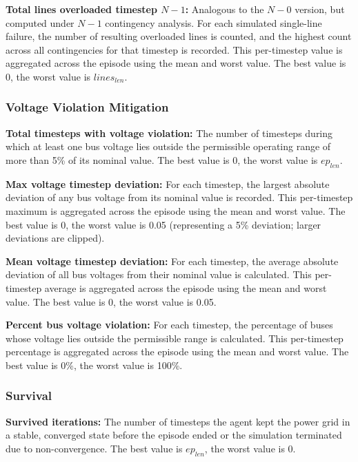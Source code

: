 \textbf{Total lines overloaded timestep $N-1$:} Analogous to the $N-0$ version, but computed under $N-1$ contingency analysis. For each simulated single-line failure, the number of resulting overloaded lines is counted, and the highest count across all contingencies for that timestep is recorded. This per-timestep value is aggregated across the episode using the mean and worst value. The best value is 0, the worst value is $lines_{len}$.


\subsubsection{Voltage Violation Mitigation}
\label{app:metrics_voltage_violation_mitigation}

\textbf{Total timesteps with voltage violation:} The number of timesteps during which at least one bus voltage lies outside the permissible operating range of more than 5\% of its nominal value. The best value is 0, the worst value is $ep_{len}$.

\textbf{Max voltage timestep deviation:} For each timestep, the largest absolute deviation of any bus voltage from its nominal value is recorded. This per-timestep maximum is aggregated across the episode using the mean and worst value. The best value is 0, the worst value is 0.05 (representing a 5\% deviation; larger deviations are clipped).

\textbf{Mean voltage timestep deviation:} For each timestep, the average absolute deviation of all bus voltages from their nominal value is calculated. This per-timestep average is aggregated across the episode using the mean and worst value. The best value is 0, the worst value is 0.05.

\textbf{Percent bus voltage violation:} For each timestep, the percentage of buses whose voltage lies outside the permissible range is calculated. This per-timestep percentage is aggregated across the episode using the mean and worst value. The best value is 0\%, the worst value is 100\%.


\subsubsection{Survival}
\label{app:metrics_survival}

\textbf{Survived iterations:} The number of timesteps the agent kept the power grid in a stable, converged state before the episode ended or the simulation terminated due to non-convergence. The best value is $ep_{len}$, the worst value is 0.


